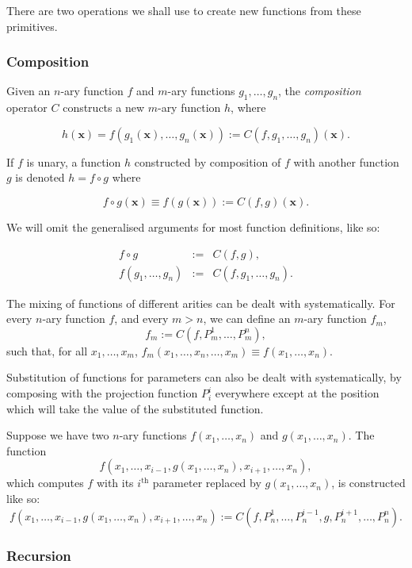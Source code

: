 \documentclass[a4paper]{article}
\newcommand{\xvec}{\mathbf{x}}	%
\theoremstyle{plain}
\theoremstyle{definition}
\begin{document}
There are two operations we shall use to create new functions from these primitives.

\subsubsection{Composition} 

Given an $n$-ary function $f$ and $m$-ary functions $g_1, \dots, g_n$, the {\it composition} operator $C$ constructs a new $m$-ary function $h$, where

\[ h(\xvec) = f(g_1(\xvec),\dots, g_n(\xvec)) := C(f,g_1, \dots, g_n)(\xvec). \]

If $f$ is unary, a function $h$ constructed by composition of $f$ with another function $g$ is denoted $h = f \circ g$ where

\[f \circ g(\xvec) \equiv f(g(\xvec)) := C(f,g)(\xvec).\] 

We will omit the generalised arguments for most function definitions, like so:

\begin{eqnarray*}
	f \circ g &:=& C(f,g), \\
	f(g_1, \dots, g_n) &:=& C(f,g_1, \dots, g_n).
\end{eqnarray*}

The mixing of functions of different arities can be dealt with systematically. For every $n$-ary function $f$, and every $m > n$, we can define an $m$-ary function $f_m$, 
\[f_m := C(f,P_m^1, \dots, P_m^n),\]
such that, for all $x_1, \dots, x_m$, $f_m(x_1, \dots, x_n, \dots, x_m) \equiv f(x_1, \dots, x_n)$.

Substitution of functions for parameters can also be dealt with systematically, by composing with the projection function $P_i^i$ everywhere except at the position which will take the value of the substituted function.

Suppose we have two $n$-ary functions $f(x_1,\dots,x_n)$ and $g(x_1,\dots,x_n)$. The function \[f(x_1,\dots,x_{i-1},g(x_1,\dots,x_n),x_{i+1},\dots,x_n),\] which computes $f$ with its $i^{\textrm{th}}$ parameter replaced by $g(x_1,\dots,x_n)$, is constructed like so:
\[f(x_1,\dots,x_{i-1},g(x_1,\dots,x_n),x_{i+1},\dots,x_n) := C(f,P_n^1,\dots,P_n^{i-1},g,P_n^{i+1},\dots,P_n^n).\]



\subsubsection{Recursion}
\end{document}
